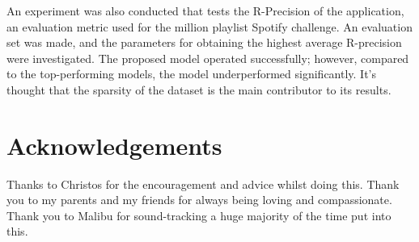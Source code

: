 An experiment was also conducted that tests the R-Precision of the application, an evaluation metric used for the million playlist Spotify challenge. An evaluation set was made, and the parameters for obtaining the highest average R-precision were investigated. The proposed model operated successfully; however, compared to the top-performing models, the model underperformed significantly. It's thought that the sparsity of the dataset is the main contributor to its results.

\frontmatter

\singlespacing

\setlength{\parskip}{0ex} %

\clearpage
{}
\tableofcontents
\clearpage
{}
{}
\listoffigures
\clearpage
{}



\setlength{\parskip}{1ex plus 0.2ex minus 0.2ex} %

\onehalfspacing

\chapter{Acknowledgements}

Thanks to Christos for the encouragement and advice whilst doing this. Thank you to my parents and my friends for always being loving and compassionate. Thank you to Malibu for sound-tracking a huge majority of the time put into this.
